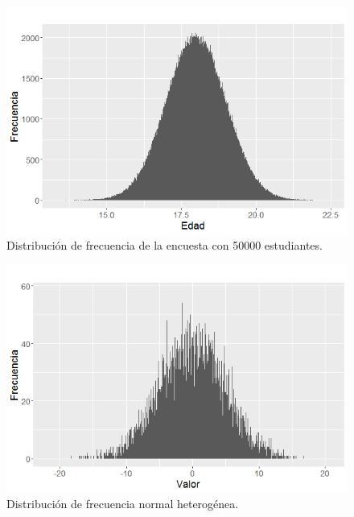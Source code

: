 \documentclass[]{article}
\begin{document}
\begin{figure}[b]
    \centering
    \includegraphics[width=.5\linewidth]{Ideal.png}    \caption{Distribución de frecuencia de la encuesta con 50000 estudiantes.}
    \label{fig:Regular}
\end{figure}

\begin{figure}[b]
    \centering
    \includegraphics[width=.5\linewidth]{Heterogenea.png}    \caption{Distribución de frecuencia normal heterogénea.}
    \label{fig:Heterogenea}
\end{figure}
\end{document}
